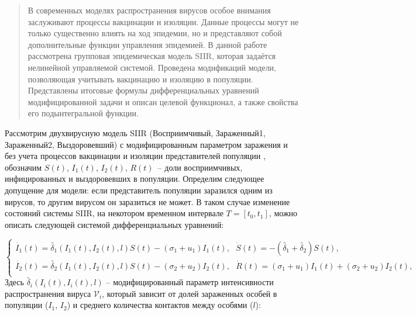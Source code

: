 \maketitle

\begin{abstract}
В современных моделях распространения вирусов особое внимания заслуживают процессы вакцинации и изоляции. Данные процессы могут не только существенно влиять на ход эпидемии, но и представляют собой дополнительные функции управления эпидемией. В данной работе рассмотрена групповая эпидемическая модель SIIR, которая задаётся нелинейной управляемой системой. Проведена модификаций модели, позволяющая учитывать вакцинацию и изоляцию в популяции. Представлены итоговые формулы дифференциальных уравнений модифицированной задачи и описан целевой функционал, а также свойства его подынтегральной функции.

\end{abstract}

Рассмотрим двухвирусную модель SIIR (Восприимчивый, Зараженный1, Зараженный2, Выздоровевший) с модифицированным параметром заражения и без учета процессов вакцинации и изоляции представителей популяции \cite{kosyan}, обозначим $S(t)$, $I_1(t)$, $I_2(t)$, $R(t)$~-- доли восприимчивых, инфицированных и выздоровевших в популяции. Определим следующее допущение для модели: если представитель популяции заразился одним из вирусов, то другим вирусом он заразиться не может. В таком случае изменение состояний системы SIIR, на некотором временном интервале $T = [t_0, t_1]$, можно описать следующей системой дифференциальных уравнений:

\begin{equation}\label{SIIR_sys}
	\begin{cases}
        \dot{I_1}(t)=\widetilde{\delta_1}(I_1(t),I_2(t),l) S(t) - (\sigma_1 + u_1)I_1(t), 
        \ \ \
		\dot{S}(t)=-(\widetilde{\delta_1} + \widetilde{\delta_2})S(t), \\
        \dot{I_2}(t)=\widetilde{\delta_2}(I_1(t),I_2(t),l) S(t) - (\sigma_2 + u_2)I_2(t), 	\ \ \
		\dot{R}(t)=(\sigma_1+u_1) I_1(t)+(\sigma_2+u_2 )I_2(t), \\
	\end{cases}
\end{equation}
Здесь $\widetilde{\delta_i}(I_i(t),I_i(t),l)$ -- модифицированный параметр интенсивности распространения вируса $\mathcal{V}_i$, который зависит от долей зараженных особей в популяции ($I_1$, $I_2$) и среднего количества контактов между особями ($l$): 

